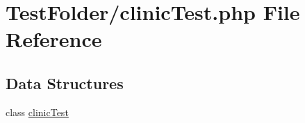 \hypertarget{clinic_test_8php}{}\section{Test\+Folder/clinic\+Test.php File Reference}
\label{clinic_test_8php}
\subsection*{Data Structures}
\begin{DoxyCompactItemize}
\item 
class \hyperlink{classclinic_test}{clinic\+Test}
\end{DoxyCompactItemize}
